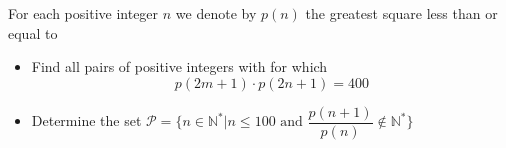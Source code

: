 For each positive integer $n$ we denote by $p(n)$ the greatest square less than or equal to 
\begin{itemize}
	\item Find all pairs of positive integers  with  for which
\[ p(  2m+1) \cdot p(  2n+1)  =400 \]
	\item Determine the set $\mathcal{P}=\{  n\in\mathbb{N}^{\ast}\vert n\leq100\text{ and }\dfrac{p(n+1)}{p(n)}\notin\mathbb{N}^{\ast}\}$
\end{itemize}
